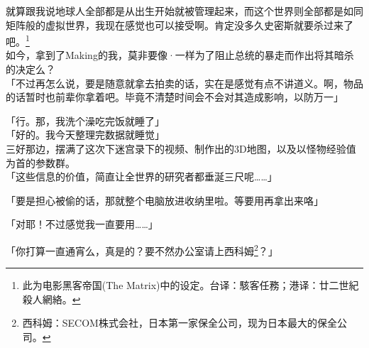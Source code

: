 就算跟我说地球人全部都是从出生开始就被管理起来，而这个世界则全部都是如同矩阵般的虚拟世界，我现在感觉也可以接受啊。肯定没多久史密斯就要杀过来了吧。\footnote{此为电影黑客帝国(The Matrix)中的设定。台译：駭客任務；港译：廿二世紀殺人網絡。}\\

如今，拿到了Making的我，莫非要像·一样为了阻止总统的暴走而作出将其暗杀的决定么？\\

「不过再怎么说，要是随意就拿去拍卖的话，实在是感觉有点不讲道义。啊，物品的话暂时也前辈你拿着吧。毕竟不清楚时间会不会对其造成影响，以防万一」

「行。那，我洗个澡吃完饭就睡了」\\

「好的。我今天整理完数据就睡觉」\\

三好那边，摆满了这次下迷宫录下的视频、制作出的3D地图，以及以怪物经验值为首的参数群。\\

「这些信息的价值，简直让全世界的研究者都垂涎三尺呢……」

「要是担心被偷的话，那就整个电脑放进收纳里啦。等要用再拿出来咯」

「对耶！不过感觉我一直要用……」

「你打算一直通宵么，真是的？要不然办公室请上西科姆\footnote{西科姆：SECOM株式会社，日本第一家保全公司，现为日本最大的保全公司。}？」

